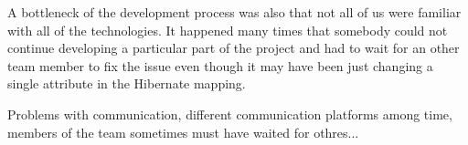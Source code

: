 A bottleneck of the development process was also that not all of us were familiar with all of the technologies. It happened many times that somebody could not continue developing a particular part of the project and had to wait for an other team member to fix the issue even though it may have been just changing a single attribute in the Hibernate mapping.

Problems with communication, different communication platforms among time, members of the team sometimes must have waited for othres...



